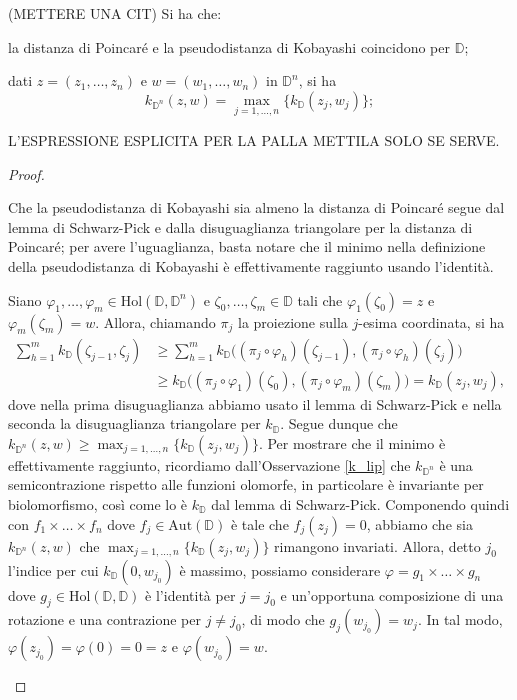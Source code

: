 \begin{prop}
    (METTERE UNA CIT) Si ha che:
    \begin{nlist}
        \item la distanza di Poincaré e la pseudodistanza di Kobayashi coincidono per $\mathbb{D}$;
        \item dati $z=(z_1,\dots,z_n)$ e $w=(w_1,\dots,w_n)$ in $\mathbb{D}^n$, si ha
        $$k_{\mathbb{D}^n}(z,w)=\max_{j=1,\dots,n}\{k_{\mathbb{D}}(z_j,w_j)\};$$
        \item L'ESPRESSIONE ESPLICITA PER LA PALLA METTILA SOLO SE SERVE.
    \end{nlist}
\end{prop}
\begin{proof}
    \begin{nlist}
        \item Che la pseudodistanza di Kobayashi sia almeno la distanza di Poincaré segue dal lemma di Schwarz-Pick e dalla disuguaglianza triangolare per la distanza di Poincaré; per avere l'uguaglianza, basta notare che il minimo nella definizione della pseudodistanza di Kobayashi è effettivamente raggiunto usando l'identità.
        \item Siano $\varphi_1,\dots,\varphi_m \in \text{Hol}(\mathbb{D},\mathbb{D}^n)$ e $\zeta_0,\dots,\zeta_m \in \mathbb{D}$ tali che $\varphi_1(\zeta_0)=z$ e $\varphi_m(\zeta_m)=w$. Allora, chiamando $\pi_j$ la proiezione sulla $j$-esima coordinata, si ha
        \begin{align*}
            \sum_{h=1}^m k_{\mathbb{D}}(\zeta_{j-1},\zeta_j) &\ge \sum_{h=1}^m k_{\mathbb{D}}\big((\pi_j\circ \varphi_h)(\zeta_{j-1}),(\pi_j\circ \varphi_h)(\zeta_j)\big)\\
            & \ge k_{\mathbb{D}}\big((\pi_j\circ \varphi_1)(\zeta_0),(\pi_j\circ \varphi_m)(\zeta_m)\big)=k_{\mathbb{D}}(z_j,w_j),
        \end{align*}
        dove nella prima disuguaglianza abbiamo usato il lemma di Schwarz-Pick e nella seconda la disuguaglianza triangolare per $k_{\mathbb{D}}$. Segue dunque che $k_{\mathbb{D}^n}(z,w)\ge\max_{j=1,\dots,n}\{k_{\mathbb{D}}(z_j,w_j)\}$.
        Per mostrare che il minimo è effettivamente raggiunto, ricordiamo dall'Osservazione \ref{k_lip} che $k_{\mathbb{D}^n}$ è una semicontrazione rispetto alle funzioni olomorfe, in particolare è invariante per biolomorfismo, così come lo è $k_{\mathbb{D}}$ dal lemma di Schwarz-Pick. Componendo quindi con $f_1\times\dots\times f_n$ dove $f_j \in \text{Aut}(\mathbb{D})$ è tale che $f_j(z_j)=0$, abbiamo che sia $k_{\mathbb{D}^n}(z,w)$ che $\max_{j=1,\dots,n}\{k_{\mathbb{D}}(z_j,w_j)\}$ rimangono invariati. Allora, detto $j_0$ l'indice per cui $k_{\mathbb{D}}(0,w_{j_0})$ è massimo, possiamo considerare $\varphi=g_1\times\dots\times g_n$ dove $g_j \in\text{Hol}(\mathbb{D},\mathbb{D})$ è l'identità per $j=j_0$ e un'opportuna composizione di una rotazione e una contrazione per $j\not=j_0$, di modo che $g_j(w_{j_0})=w_j$. In tal modo, $\varphi(z_{j_0})=\varphi(0)=0=z$ e $\varphi(w_{j_0})=w$.
    \end{nlist}
\end{proof}

